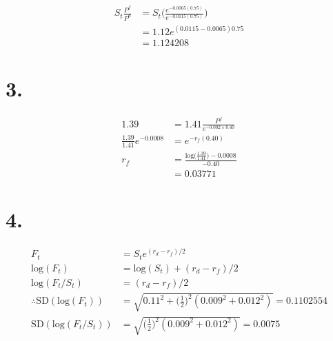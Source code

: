 \documentclass[paper=a4, fontsize=11pt]{scrartcl} %
\numberwithin{equation}{section} %
\numberwithin{figure}{section} %
\numberwithin{table}{section} %
\begin{document}
\begin{align*}
S_t \frac{P^f}{P^d} &= S_t \Bigg( \frac{e^{-0.0065(0.75)}}{e^{-0.0115(0.75)}} \Bigg)\\
&= 1.12e^{(0.0115 - 0.0065)0.75}\\
&= 1.124208
\end{align*}


\section*{3.}

\begin{align*}
1.39 &= 1.41 \frac{P^f}{e^{-0.002\times 0.40}}\\
\frac{1.39}{1.41} e^{-0.0008} &= e^{-r_f (0.40)}\\
r_f &= \frac{\text{log} \Big(\frac{1.39}{1.41} \Big) - 0.0008}{-0.40}\\
&= 0.03771
\end{align*}


\section*{4.}

\begin{align*}
F_t &= S_t e^{(r_d-r_f)/2}\\
\text{log}(F_t) &= \text{log}(S_t) + (r_d-r_f)/2\\
\text{log}(F_t / S_t) &= (r_d-r_f)/2\\
\therefore \text{SD}(\text{log}(F_t)) &= \sqrt{0.11^2 + \Big(\frac{1}{2}\Big)^2 (0.009^2 + 0.012^2)} = 0.1102554\\
\text{SD}(\text{log}(F_t/S_t)) &= \sqrt{\Big(\frac{1}{2}\Big)^2 (0.009^2 + 0.012^2)} = 0.0075
\end{align*}

\end{document}
